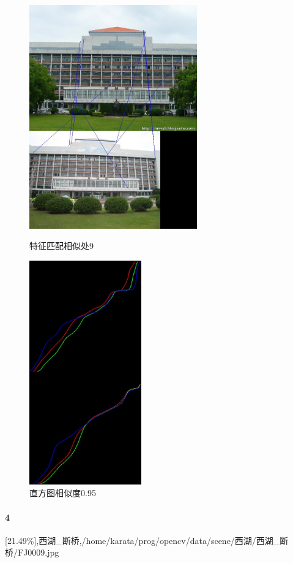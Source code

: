 \begin{figure}[htb]
\begin{minipage}[t]{0.5\linewidth}
\centering
\includegraphics[height=3.8in]{玉泉图书馆.jpg.d/im3sift.jpg}
\caption{特征匹配相似处9}
\label{fig:side:a}
\end{minipage}%
\begin{minipage}[t]{0.5\linewidth}
\centering
\includegraphics[height=3.8in]{玉泉图书馆.jpg.d/im3hist2.jpg}
\caption{直方图相似度0.95}
\label{fig:side:a}
\end{minipage}%
\end{figure}

\clearpage
\paragraph{4}
[21.49\%],西湖\_断桥,/home/karata/prog/opencv/data/scene/西湖/西湖\_断桥/FJ0009.jpg

